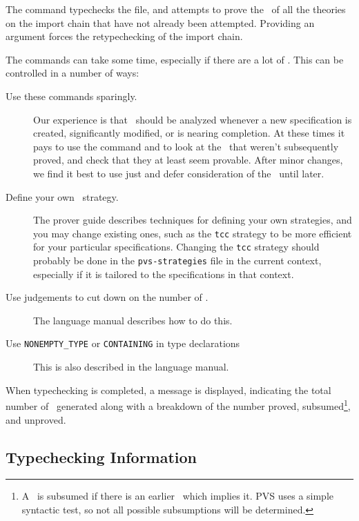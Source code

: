 The  command typechecks the file, and
attempts to prove the \tccs\ of all the theories on the import chain that
have not already been attempted.  Providing an argument forces the
retypechecking of the import chain.

The  commands can take some time, especially if there
are a lot of \tccs.  This can be controlled in a number of ways:
\begin{description}

\item[Use these commands sparingly.] Our experience is that \tccs\ should
be analyzed whenever a new specification is created, significantly
modified, or is nearing completion. 
At these times it pays to use the  command and
to look at the \tccs\ that weren't subsequently proved, and check that
they at least seem provable.
After minor changes, we find it best to use just  and
defer consideration of the \tccs\ until later.


\item[Define your own \tcc\ strategy.] The prover guide describes
techniques for defining your own strategies, and you may change existing
ones, such as the \texttt{tcc} strategy to be more efficient for your
particular specifications.  Changing the \texttt{tcc} strategy should
probably be done in the \texttt{pvs-strategies} file in the current
context, especially if it is tailored to the specifications in that
context.

\item[Use judgements to cut down on the number of
  \tccs.]  The language manual describes \newline
  how to do this.

\item[Use \texttt{NONEMPTY\_TYPE} or \texttt{CONTAINING} in type
declarations]  This is also described in the language manual.

\end{description}

When typechecking is completed, a message is displayed, indicating the
total number of \tccs\ generated along with a breakdown of the number
proved, subsumed\footnote{A \tcc\ is subsumed if there is an earlier
\tcc\ which implies it.  PVS uses a simple syntactic test, so not all
possible subsumptions will be determined.}, and unproved.

\subsection{Typechecking Information}
\label{tc-info}


